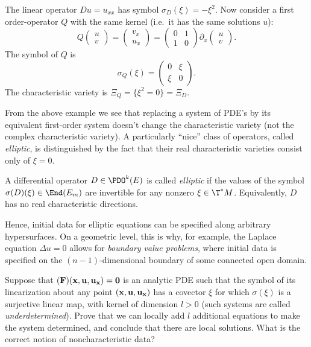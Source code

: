 \begin{example}
    The linear operator $Du=u_{xx}$ has symbol $\sigma_D(\xi)=-\xi^2$. Now consider a first order-operator $Q$ with the same kernel (i.e.\ it has the same solutions $u$):
    \[Q\begin{pmatrix}
        u\\v
    \end{pmatrix}=
    \begin{pmatrix}
        v_x\\u_x
    \end{pmatrix}=
    \begin{pmatrix}
        0& 1\\1&0
    \end{pmatrix}
    \partial_x
    \begin{pmatrix}
        u\\v
    \end{pmatrix}.
    \]
    The symbol of $Q$ is 
    \[\sigma_Q(\xi)=\begin{pmatrix}
        0&\xi\\\xi&0
    \end{pmatrix}.\]
    The characteristic variety is $\Xi_Q=\{\xi^2=0\}=\Xi_D$.
\end{example}

From the above example we see that replacing a system of PDE's by its equivalent first-order system doesn't change the characteristic variety (not the complex characteristic variety). A particularly ``nice'' class of operators, called \emph{elliptic}, is distinguished by the fact that their real characteristic varieties consist only of $\xi=0$.

\begin{defn}
    A differential operator $D\in\PDO^k(E)$ is called \emph{elliptic} if the values of the symbol $\sigma(D)(\xi)\in\End(E_m)$ are invertible for any nonzero $\xi\in \T^\ast M$. Equivalently, $D$ has no real characteristic directions.
\end{defn}

Hence, initial data for elliptic equations can be specified along arbitrary hypersurfaces. On a geometric level, this is why, for example, the Laplace equation $\Delta u=0$ allows for \emph{boundary value problems}, where initial data is specified on the $(n-1)$-dimensional boundary of some connected open domain.


\begin{xca}
    Suppose that $\bf(F)(\bf{x},\bf{u},\bf{u}_{\bf x})=0$ is an analytic PDE such that the symbol of its linearization about any point $(\bf{x},\bf{u},\bf{u}_{\bf{x}})$ has a covector $\xi$ for which $\sigma(\xi)$ is a surjective linear map, with kernel of dimension $l>0$ (such systems are called \emph{underdetermined}). Prove that we can locally add $l$ additional equations to make the system determined, and conclude that there are local solutions. What is the correct notion of noncharacteristic data?
\end{xca}


